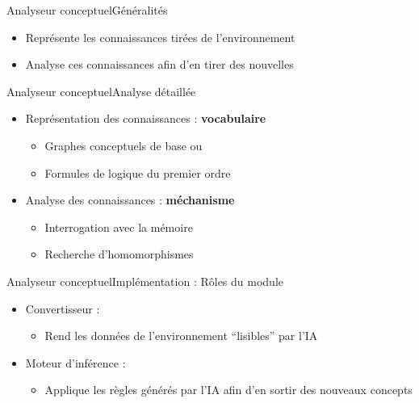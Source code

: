 \begin{frame}{Analyseur conceptuel}{Généralités}
\begin{itemize}
  \item Représente les connaissances tirées de l'environnement
  \item Analyse ces connaissances afin d'en tirer des nouvelles
\end{itemize}
\end{frame}

\begin{frame}{Analyseur conceptuel}{Analyse détaillée}
\begin{itemize}
  \item Représentation des connaissances : \textbf{vocabulaire}
  \begin{itemize}
    \item Graphes conceptuels de base ou
    \item Formules de logique du premier ordre
  \end{itemize}
  \item Analyse des connaissances : \textbf{méchanisme}
  \begin{itemize}
    \item Interrogation avec la mémoire
    \item Recherche d'homomorphismes
  \end{itemize}
\end{itemize}
\end{frame}

\begin{frame}{Analyseur conceptuel}{Implémentation : Rôles du module}
\begin{itemize}
  \item Convertisseur :
  \begin{itemize}
    \item Rend les données de l'environnement \enquote{lisibles} par l'IA
  \end{itemize}
  \item Moteur d'inférence :
  \begin{itemize}
    \item Applique les règles générés par l'IA afin d'en
    sortir des nouveaux concepts
  \end{itemize}
\end{itemize}
\end{frame}

